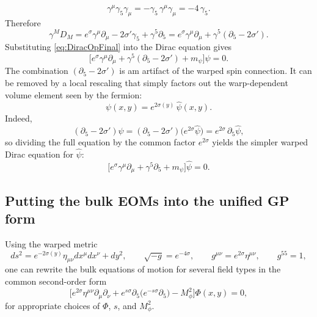 \documentclass[11pt]{article}
\begin{document}
\begin{equation}
\gamma^\mu\gamma_5\gamma_\mu
= -\gamma_5\,\gamma^\mu\gamma_\mu
= -4\,\gamma_5 .
\end{equation}
Therefore
\begin{equation}
\gamma^M D_M
= e^{\sigma}\gamma^\mu\partial_\mu
-2\sigma'\gamma_5
+ \gamma^5\partial_5
= e^{\sigma}\gamma^\mu\partial_\mu
+ \gamma^5(\partial_5-2\sigma').
\label{eq:DiracOpFinal}
\end{equation}
Substituting \eqref{eq:DiracOpFinal} into the Dirac equation gives
\begin{equation}
\Big[
e^{\sigma}\gamma^\mu\partial_\mu
+ \gamma^5(\partial_5-2\sigma')
+ m_\psi
\Big]\psi=0.
\end{equation}
The combination $(\partial_5-2\sigma')$ is am artifact of the warped spin connection. It can be removed by a local rescaling that simply factors out the warp-dependent volume element seen by the fermion:
\begin{equation}
\psi(x,y)=e^{2\sigma(y)}\,\hat\psi(x,y).
\label{eq:psihat}
\end{equation}
Indeed,
\begin{equation}
(\partial_5-2\sigma')\psi
=(\partial_5-2\sigma')\big(e^{2\sigma}\hat\psi\big)
=e^{2\sigma}\,\partial_5\hat\psi,
\end{equation}
so dividing the full equation by the common factor $e^{2\sigma}$ yields the simpler warped Dirac equation for $\hat\psi$:
\begin{equation}
\Big[
e^{\sigma}\gamma^\mu\partial_\mu
+ \gamma^5\partial_5
+ m_\psi
\Big]\hat\psi=0.
\label{eq:DiracHat}
\end{equation}

\subsection{Putting the bulk EOMs into the unified GP form}

Using the warped metric
\[
ds^2 = e^{-2\sigma(y)}\eta_{\mu\nu}dx^\mu dx^\nu + dy^2,
\qquad
\sqrt{-g}=e^{-4\sigma},
\qquad
g^{\mu\nu}=e^{2\sigma}\eta^{\mu\nu},
\qquad
g^{55}=1,
\]
one can rewrite the bulk equations of motion for several field types in the common second-order form
\begin{equation}
\Big[
e^{2\sigma}\eta^{\mu\nu}\partial_\mu\partial_\nu
+ e^{s\sigma}\partial_5\!\big(e^{-s\sigma}\partial_5\big)
- M_\phi^{2}
\Big]\Phi(x,y)=0,
\label{eq:GPmaster}
\end{equation}
for appropriate choices of $\Phi$, $s$, and $M_\phi^2$.
\end{document}
